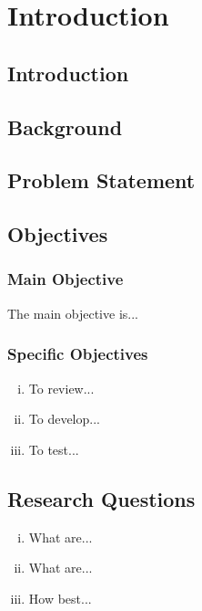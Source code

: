 \chapter{Introduction}
\label{chapter:introduction} %
\section{Introduction}
\label{sec:intro}


\section{Background}
\label{sec:background}


\section{Problem Statement} \label{problem}


\section{Objectives} \label{researchobjectives}
\subsection{Main Objective }
\noindent The main objective is...

\subsection{Specific Objectives}
\begin{enumerate}[(i)]
\item To review...
\item To develop...
\item To test...
\end{enumerate}
\section{Research Questions} \label{researchquestions}
\begin{enumerate}[(i)]
\item What are...
\item What are...
\item How best...
\end{enumerate}
